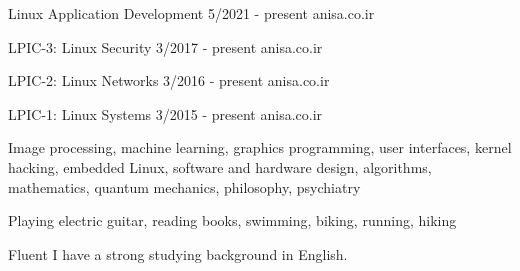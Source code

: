\documentclass[a4paper,12pt]{memoir} %
\begin{document}

{Linux Application Development}
{5/2021 - present}
{}
{anisa.co.ir}


{LPIC-3: Linux Security}
{3/2017 - present}
{}
{anisa.co.ir}


{LPIC-2: Linux Networks}
{3/2016 - present}
{}
{anisa.co.ir}


{LPIC-1: Linux Systems}
{3/2015 - present}
{}
{anisa.co.ir}


\Sep %




{Image processing, machine learning, graphics programming, user interfaces, kernel hacking, embedded Linux, software and hardware design, algorithms, mathematics, quantum mechanics, philosophy, psychiatry}


{Playing electric guitar, reading books, swimming, biking, running, hiking}


\Sep %




{Fluent}
{I have a strong studying background in English.}
\end{document}
